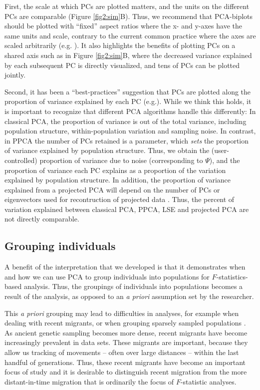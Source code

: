 \documentclass[12pt, letterpaper]{article}
\begin{document}
First, the scale at which PCs are plotted matters, and the units on the different PCs are comparable (Figure \ref{fig2:sim}B). Thus, we recommend that PCA-biplots should be plotted with ``fixed'' aspect ratios where the x- and y-axes have the same units and scale, contrary to the current common practice where the axes are scaled arbitrarily (e.g. \cite{novembre_genes_2008, peter_genetic_2020}). It also highlights the benefits of plotting PCs on a shared axis such as in Figure \ref{fig2:sim}B, where the decreased variance explained by each subsequent PC is directly visualized, and tens of PCs can be plotted jointly.

Second, it has been a ``best-practices'' suggestion that PCs are plotted along the proportion of variance explained by each PC (e.g.\cite{novembre_recent_2016, elhaik_principal_2022}). While we think this holds, it is important to recognize that different PCA algorithms handle this differently: In classical PCA, the proportion of variance is out of the total variance, including population structure, within-population variation and sampling noise. In contrast, in PPCA the number of PCs retained is a parameter, which \emph{sets} the proportion of variance explained by population structure. Thus, we obtain the (user-controlled) proportion of variance due to noise (corresponding to $\Psi$), and the proportion of variance each PC explains as a proportion of the variation explained by population structure. In addition, the proportion of variance explained from a projected PCA will depend on the number of PCs or eigenvectors used for recontruction of projected data \cite{patterson_population_2006}. 
Thus, the percent of variation explained between classical PCA, PPCA, LSE and projected PCA are not directly comparable.

\subsection{Grouping individuals}
A benefit of the interpretation that we developed is that it demonstrates when and how we can use PCA to group individuals into populations for $F$-statistics-based analysis. 
Thus, the groupings of individuals into populations becomes a result of the analysis, as opposed to an \textit{a priori} assumption set by the researcher.

This \textit{a priori} grouping may lead to difficulties in analyses, for example when dealing with recent migrants, or when grouping sparsely sampled populations \cite{shringarpure_effects_2014}. As ancient genetic sampling becomes more dense, recent migrants have become increasingly prevalent in data sets. These migrants are important, because they allow us tracking of movements -- often over large distances -- within the last handful of generations. Thus, these recent migrants have become an important focus of study and it is desirable to distinguish recent migration from the more distant-in-time migration that is ordinarily the focus of $F$-statistic analyses.
\end{document}
